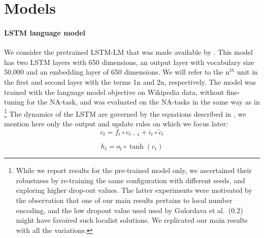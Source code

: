 
\section{Models}


\paragraph{LSTM language model}\label{ssec:lstm_lm}
We consider the pretrained LSTM-LM that was made available by \cite{Gulordava:etal:2018}.
This model has two LSTM layers with 650 dimensions, an output layer with vocabulary size 50,000 and an embedding layer of 650 dimensions. We will refer to the n$^{th}$ unit in the first and second layer with the terms \unit{1}{n} and \unit{2}{n}, respectively. The model was trained with the language model objective on Wikipedia data, without fine-tuning for the NA-task, and was evaluated on the NA-tasks in the same way as in \footnote{While we report results for the pre-trained model only, we ascertained their robustness by re-training the same configuration with different seeds, and exploring higher drop-out values. The latter experiments were motivated by the observation that one of our main results pertains to local number encoding, and the low dropout value used used by Gulordava et al.~(0.2) might have favoired such localist solutions. We replicated our main results with all the variations.} The dynamics of the LSTM are governed by the equations described in \cite{Hochreiter:Schmidhuber:1997}, we mention here only the output and update rules on which we focus later:
\begin{equation} \label{eq:update-rule}
     c_t = f_t\circ c_{t-1} + i_t\circ \widetilde{c}_t
\end{equation}

\begin{equation} \label{eq:output}
     h_t = o_t\circ \tanh(c_t)
\end{equation}


